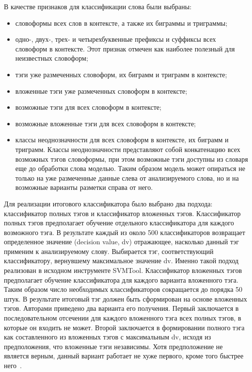 В качестве признаков для классификации слова были выбраны:
\begin{itemize}
	\item словоформы всех слов в контексте, а также их биграммы и триграммы;
	\item одно-, двух-, трех- и четырехбуквенные префиксы и суффиксы всех словоформ в контексте. Этот признак отмечен как наиболее полезный для неизвестных словоформ;
	\item тэги уже размеченных словоформ, их биграмм и триграмм в контексте;
	\item вложенные тэги уже размеченных словоформ в контексте;
	\item возможные тэги для всех словоформ в контексте;
	\item возможные вложенные тэги для всех словоформ в контексте;
	\item классы неоднозначности для всех словоформ в контексте, их биграмм и триграмм. Классы неоднозначности представляют собой конкатенацию всех возможных тэгов словоформы, при этом возможные тэги доступны из словаря еще до обработки слова моделью. Таким образом модель может опираться не только на уже размеченные данные слева от анализируемого слова, но и на возможные варианты разметки справа от него.
\end{itemize}

Для реализации итогового классификатора было выбрано два подхода: классификатор полных тэгов и классификатор вложенных тэгов. Классификатор полных тэгов предполагает обучение отдельного классификатора для каждого возможного тэга. В результате каждый из около 500 классификаторов возвращает определенное значение (decision value, dv) отражающее, насколько данный тэг применим к анализируемому слову. Выбирается тэг, соответствующий классификатору, вернувшему максимальное значение dv. Именно такой подход реализован в исходном инструменте SVMTool. Классификатор вложенных тэгов предполагает обучение классификатора для каждого варианта вложенного тэга. Таким образом число необходимых классификаторов сокращается до порядка 50 штук. В результате итоговый тэг должен быть сформирован на основе вложенных тэгов. Авторами приведено два варианта его получения. Первый заключается в последовательном отсечении для каждого вложенного тэга всех полных тэгов, в которые он входить не может. Второй заключается в формировании полного тэга как составленного из вложенных тэгов с максимальным dv, исходя из предположения, что вложенные тэги независимы. Хотя предположение не является верным, данный вариант работает не хуже первого, кроме того быстрее него~\cite{Petrochenkov2013}.

